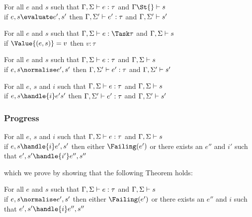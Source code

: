 \begin{theorem}
      For all $e$ and $s$ such that
      $\Gamma,\Sigma\vdash e:\tau$ and $\Gamma\St{}\infers s$\\
      if $e,s\evaluate e',s'$
      then $\Gamma,\Sigma'\vdash e':\tau$ and $\Gamma,\Sigma'\vdash s'$
      \label{thmpreseval}
\end{theorem}

\begin{lemma}
  For all $e$ and $s$ such that $\Gamma,\Sigma\infers e:\Task\tau$ and $\Gamma,\Sigma\vdash s$\\
  if $\Value{(e,s)}=v$ then $v:\tau$
  \label{lemmavaluepreserves}
\end{lemma}

\begin{theorem}
    For all $e$ and $s$ such that $\Gamma,\Sigma\vdash e:\tau$ and $\Gamma,\Sigma\vdash s$\\
    if   $e,s \normalise e',s'$ then $\Gamma,\Sigma'\vdash e':\tau$ and $\Gamma,\Sigma'\vdash s'$
    \label{thmpresnorm}
\end{theorem}

\begin{theorem}
  For all $e$, $s$ and $i$ such that $\Gamma,\Sigma\vdash e:\tau$ and $\Gamma,\Sigma\vdash s$\\
  if $ e,s \handle{i} e's'$ then $\Gamma,\Sigma'\vdash e':\tau$ and $\Gamma,\Sigma'\vdash s'$
   \label{thmpreshandle}
\end{theorem}

\subsubsection{Progress}

\begin{theorem}
 For all $e$, $s$ and $i$ such that $\Gamma,\Sigma\vdash e:\tau$ and $\Gamma,\Sigma\vdash s$\\
 if $e,s \handle{i} e',s'$ then either $\Failing(e')$ or there exists an $e''$ and $i'$ such that $e',s'\handle{i'}e'',s''$
\end{theorem}

which we prove by showing that the following Theorem holds:
\begin{theorem}
  For all $e$ and $s$ such that $\Gamma,\Sigma\vdash e:\tau$ and $\Gamma,\Sigma\vdash s$\\
  if $e,s \normalise e',s'$ then either $\Failing(e')$ or there exists an $e''$ and $i$ such that $e',s'\handle{i}e'',s''$
  \label{thmprogressnorm}
\end{theorem}

